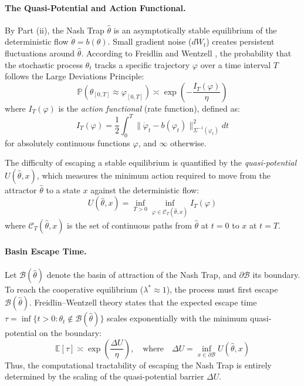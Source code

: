 \paragraph{The Quasi-Potential and Action Functional.}
By Part (ii), the Nash Trap $\hat{\theta}$ is an asymptotically stable equilibrium of the deterministic flow $\dot{\theta} = b(\theta)$. Small gradient noise ($dW_t$) creates persistent fluctuations around $\hat{\theta}$.
According to Freidlin and Wentzell \citep{freidlin2012random}, the probability that the stochastic process $\theta_t$ tracks a specific trajectory $\varphi$ over a time interval $T$ follows the Large Deviations Principle:
\begin{equation}
\mathbb{P}(\theta_{[0,T]} \approx \varphi_{[0,T]}) \asymp \exp\left( - \frac{I_T(\varphi)}{\eta} \right)
\end{equation}
where $I_T(\varphi)$ is the \emph{action functional} (rate function), defined as:
\begin{equation}
I_T(\varphi) = \frac{1}{2} \int_0^T \|\dot{\varphi}_t - b(\varphi_t)\|_{\Sigma^{-1}(\varphi_t)}^2 dt
\label{eq:action_functional}
\end{equation}
for absolutely continuous functions $\varphi$, and $\infty$ otherwise.

The difficulty of escaping a stable equilibrium is quantified by the \emph{quasi-potential} $U(\hat{\theta}, x)$, which measures the minimum action required to move from the attractor $\hat{\theta}$ to a state $x$ against the deterministic flow:
\begin{equation}
U(\hat{\theta}, x) = \inf_{T>0} \inf_{\varphi \in \mathcal{C}_{T}(\hat{\theta}, x)} I_T(\varphi)
\end{equation}
where $\mathcal{C}_{T}(\hat{\theta}, x)$ is the set of continuous paths from $\hat{\theta}$ at $t=0$ to $x$ at $t=T$.

\paragraph{Basin Escape Time.}
Let $\mathcal{B}(\hat{\theta})$ denote the basin of attraction of the Nash Trap, and $\partial \mathcal{B}$ its boundary.
To reach the cooperative equilibrium ($\lambda^* \approx 1$), the process must first escape $\mathcal{B}(\hat{\theta})$.
Freidlin--Wentzell theory states that the expected escape time $\tau = \inf\{t > 0 : \theta_t \notin \mathcal{B}(\hat{\theta})\}$ scales exponentially with the minimum quasi-potential on the boundary:
\begin{equation}
\mathbb{E}[\tau] \asymp \exp\left( \frac{\Delta U}{\eta} \right), \quad \text{where} \quad \Delta U = \inf_{x \in \partial \mathcal{B}} U(\hat{\theta}, x)
\label{eq:fw_escape_time}
\end{equation}
Thus, the computational tractability of escaping the Nash Trap is entirely determined by the scaling of the quasi-potential barrier $\Delta U$.


